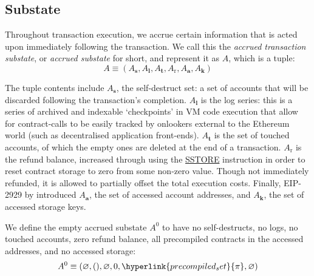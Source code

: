 \documentclass[9pt,oneside]{amsart}
\begin{document}
\begin{multicols}{2}
\subsection{Substate}
Throughout transaction execution, we accrue certain information that is acted upon immediately following the transaction. We call this the \textit{accrued transaction substate}, or \textit{accrued substate} for short, and represent it as $A$, which is a tuple:
\begin{equation}
A \equiv (A_{\mathbf{s}}, A_{\mathbf{l}}, A_{\mathbf{t}}, A_{\mathrm{r}}, A_{\mathbf{a}}, A_{\mathbf{k}})
\end{equation}

\hypertarget{self_destruct_set_wordy_defn_A__s}{}The tuple contents include $A_{\mathbf{s}}$, the self-destruct set: a set of accounts that will be discarded following the transaction's completion.
\hypertarget{tx_log_series_wordy_defn_A__l}{} $A_{\mathbf{l}}$ is the log series: this is a series of archived and indexable `checkpoints' in VM code execution that allow for contract-calls to be easily tracked by onlookers external to the Ethereum world (such as decentralised application front-ends).
\hypertarget{tx_touched_accounts_wordy_defn_A__t}{} $A_{\mathbf{t}}$ is the set of touched accounts, of which the empty ones are deleted at the end of a transaction.
\hypertarget{refund_balance_defn_words_A__r}{}$A_{\mathrm{r}}$ is the refund balance, increased through using the \hyperlink{SSTORE}{{\small SSTORE}} instruction in order to reset contract storage to zero from some non-zero value. Though not immediately refunded, it is allowed to partially offset the total execution costs.
Finally, EIP-2929 by \cite{EIP-2929} introduced \hypertarget{accessed_addresses_defn_words_A__a}{}$A_{\mathbf{a}}$, the set of accessed account addresses, and \hypertarget{accessed_storage_keys_defn_words_A__k}{}$A_{\mathbf{k}}$, the set of accessed storage keys.

We define the empty accrued substate $A^0$ to have no self-destructs, no logs, no touched accounts, zero refund balance, all precompiled contracts in the accessed addresses, and no accessed storage:
\begin{equation}
A^0 \equiv (\varnothing, (), \varnothing, 0, \hyperlink{precompiled_set}{\pi}, \varnothing)
\end{equation}


\end{multicols}
\end{document}
